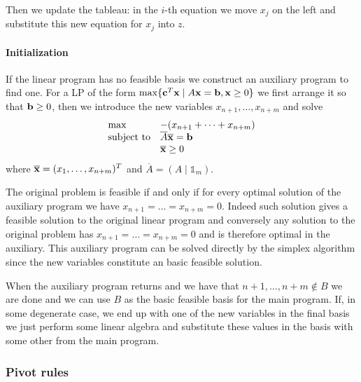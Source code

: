 \documentclass[12pt]{extarticle}
\renewcommand{\vec}[1]{\bvec{#1}}
\begin{document}
Then we update the tableau: in the $i$-th equation we move $x_j$ on the left and substitute this new
equation for $x_j$ into $z$.

\paragraph{Initialization}
If the linear program has no  feasible basis we construct an auxiliary program to find
one.
For a LP of the form $\max \{ \vec c^T \vec x \mid A \vec x = \vec b, \vec x \geq 0 \}$ we first
arrange it so that $\vec b \geq 0$, then we introduce the new variables $x_{n+1}, \dots, x_{n+m}$
and solve
\begin{equation}
	\begin{array}{ll}
		\max              & -(x_{n+1} + \dots + x_{n+m})           \\
		\text{subject to} & \overline A \overline{\vec x} = \vec b \\
		                  & \overline{\vec x} \geq 0
	\end{array}
\end{equation}
where $\overline{\vec x} = (x_1, \dots, x_{n+m})^T$ and $\overline A = (A \mid \mathds 1_m)$.

The original problem is feasible if and only if for every optimal solution of the auxiliary program
we have $x_{n+1} = \dots = x_{n + m} = 0$.
Indeed such solution gives a feasible solution to the original linear program and conversely any
solution to the original problem has $x_{n+1} = \dots = x_{n + m} = 0$ and is therefore optimal in
the auxiliary.
This auxiliary program can be solved directly by the simplex algorithm since the new variables
constitute an basic feasible solution.

When the auxiliary program returns and we have that $n+1, \dots, n+m \notin B$ we are done and we
can use $B$ as the basic feasible basis for the main program. If, in some degenerate case, we end up
with one of the new variables in the final basis we just perform some linear algebra and substitute
these values in the basis with some other from the main program.

\subsubsection{Pivot rules}
\end{document}
